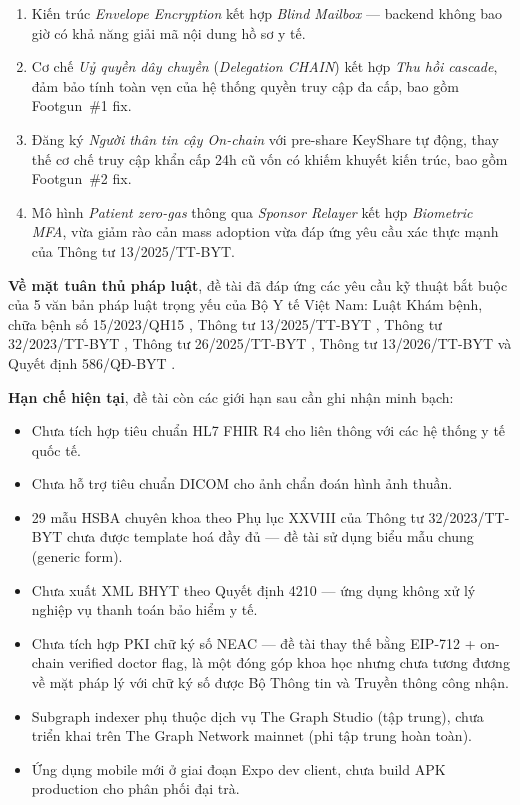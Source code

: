 \documentclass[../DoAn]{subfiles}
\begin{document}
\begin{enumerate}
    \item Kiến trúc \textit{Envelope Encryption} kết hợp \textit{Blind Mailbox} --- backend không bao giờ có khả năng giải mã nội dung hồ sơ y tế.
    \item Cơ chế \textit{Uỷ quyền dây chuyền} (\textit{Delegation CHAIN}) kết hợp \textit{Thu hồi cascade}, đảm bảo tính toàn vẹn của hệ thống quyền truy cập đa cấp, bao gồm Footgun~\#1 fix.
    \item Đăng ký \textit{Người thân tin cậy On-chain} với pre-share KeyShare tự động, thay thế cơ chế truy cập khẩn cấp 24h cũ vốn có khiếm khuyết kiến trúc, bao gồm Footgun~\#2 fix.
    \item Mô hình \textit{Patient zero-gas} thông qua \textit{Sponsor Relayer} kết hợp \textit{Biometric MFA}, vừa giảm rào cản mass adoption vừa đáp ứng yêu cầu xác thực mạnh của Thông tư 13/2025/TT-BYT.
\end{enumerate}

\textbf{Về mặt tuân thủ pháp luật}, đề tài đã đáp ứng các yêu cầu kỹ thuật bắt buộc của 5 văn bản pháp luật trọng yếu của Bộ Y tế Việt Nam: Luật Khám bệnh, chữa bệnh số 15/2023/QH15 \cite{luatkcb2023}, Thông tư 13/2025/TT-BYT \cite{tt13_2025_byt}, Thông tư 32/2023/TT-BYT \cite{tt32_2023_byt}, Thông tư 26/2025/TT-BYT \cite{tt26_2025_byt}, Thông tư 13/2026/TT-BYT \cite{tt13_2026_byt} và Quyết định 586/QĐ-BYT \cite{qd586_2026_byt}.

\textbf{Hạn chế hiện tại}, đề tài còn các giới hạn sau cần ghi nhận minh bạch:

\begin{itemize}
    \item Chưa tích hợp tiêu chuẩn HL7 FHIR R4 cho liên thông với các hệ thống y tế quốc tế.
    \item Chưa hỗ trợ tiêu chuẩn DICOM cho ảnh chẩn đoán hình ảnh thuần.
    \item 29 mẫu HSBA chuyên khoa theo Phụ lục XXVIII của Thông tư 32/2023/TT-BYT chưa được template hoá đầy đủ --- đề tài sử dụng biểu mẫu chung (generic form).
    \item Chưa xuất XML BHYT theo Quyết định 4210 --- ứng dụng không xử lý nghiệp vụ thanh toán bảo hiểm y tế.
    \item Chưa tích hợp PKI chữ ký số NEAC --- đề tài thay thế bằng EIP-712 + on-chain verified doctor flag, là một đóng góp khoa học nhưng chưa tương đương về mặt pháp lý với chữ ký số được Bộ Thông tin và Truyền thông công nhận.
    \item Subgraph indexer phụ thuộc dịch vụ The Graph Studio (tập trung), chưa triển khai trên The Graph Network mainnet (phi tập trung hoàn toàn).
    \item Ứng dụng mobile mới ở giai đoạn Expo dev client, chưa build APK production cho phân phối đại trà.
\end{itemize}
\end{document}
